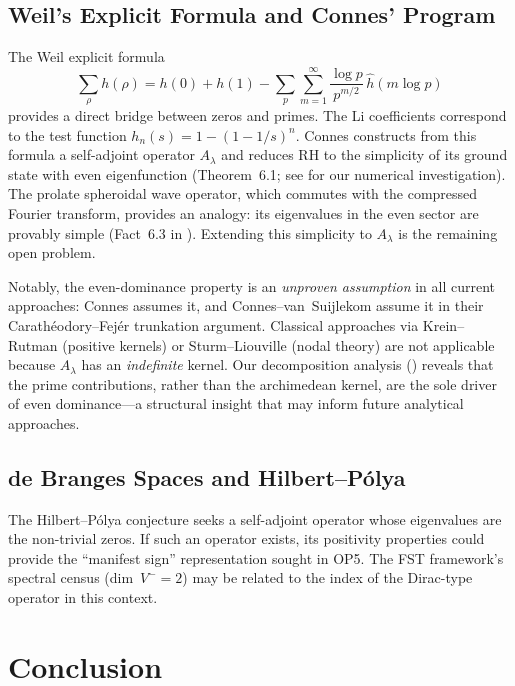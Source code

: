 \documentclass[12pt,a4paper]{article}
\theoremstyle{definition}
\theoremstyle{remark}
\begin{document}
\subsection{Weil's Explicit Formula and Connes' Program}
The Weil explicit formula
\[ \sum_\rho h(\rho) = h(0) + h(1) - \sum_p \sum_{m=1}^\infty \frac{\log p}{p^{m/2}}\,\hat{h}(m\log p) \]
provides a direct bridge between zeros and primes. The Li coefficients correspond to the test function $h_n(s) = 1-(1-1/s)^n$. Connes \cite{Connes2025} constructs from this formula a self-adjoint operator $A_\lambda$ and reduces RH to the simplicity of its ground state with even eigenfunction (Theorem~6.1; see  for our numerical investigation). The prolate spheroidal wave operator, which commutes with the compressed Fourier transform, provides an analogy: its eigenvalues in the even sector are provably simple (Fact~6.3 in \cite{Connes2025}). Extending this simplicity to $A_\lambda$ is the remaining open problem.

Notably, the even-dominance property is an \emph{unproven assumption} in all current approaches: Connes \cite{Connes2025} assumes it, and Connes--van~Suijlekom \cite{ConnesvS2025} assume it in their Carath\'eodory--Fej\'er trunkation argument. Classical approaches via Krein--Rutman (positive kernels) or Sturm--Liouville (nodal theory) are not applicable because $A_\lambda$ has an \emph{indefinite} kernel. Our decomposition analysis () reveals that the prime contributions, rather than the archimedean kernel, are the sole driver of even dominance---a structural insight that may inform future analytical approaches.

\subsection{de Branges Spaces and Hilbert--P\'olya}
The Hilbert--P\'olya conjecture seeks a self-adjoint operator whose eigenvalues are the non-trivial zeros. If such an operator exists, its positivity properties could provide the ``manifest sign'' representation sought in OP5. The FST framework's spectral census (dim~$V^- = 2$) may be related to the index of the Dirac-type operator in this context.


\section{Conclusion}
\end{document}
